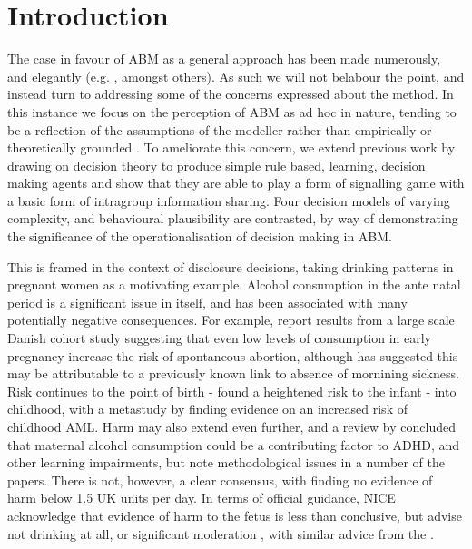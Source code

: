\section{Introduction}
\label{sec:intro}

The case in favour of \ac{ABM} as a general approach has been made numerously, and elegantly (e.g. \citet{Silverman2011,Silverman2013,Resnick,gilbert1999simulation,epstein1994growing,Macy2002a,Axelrod1997}, amongst others). As such we will not belabour the point, and instead turn to addressing some of the concerns expressed about the method. In this instance we focus on the perception of \ac{ABM} as ad hoc in nature, tending to be a reflection of the assumptions of the modeller rather than empirically or theoretically grounded \citep{Waldherr2013}. To ameliorate this concern, we extend previous work by \cite{GrayDissert} drawing on decision theory to produce simple rule based, learning, decision making agents and show that they are able to play a form of signalling game \citep{Kreps1987} with a basic form of intragroup information sharing. Four decision models of varying complexity, and behavioural plausibility are contrasted, by way of demonstrating the significance of the operationalisation of decision making in \ac{ABM}.

This is framed in the context of disclosure decisions, taking drinking patterns in pregnant women as a motivating example. Alcohol consumption in the ante natal period is a significant issue in itself, and has been associated with many potentially negative consequences. For example, \citet{Andersen2012} report results from a large scale Danish cohort study suggesting that even low levels of consumption in early pregnancy increase the risk of spontaneous abortion, although \citet{Savitz2012} has suggested this may be attributable to a previously known link to absence of mornining sickness. Risk continues to the point of birth - \citet{Kesmodel2002} found a heightened risk to the infant - into childhood, with a metastudy by \citet{Latino-Martel2010} finding evidence on an increased risk of childhood \ac{AML}. Harm may also extend even further, and a review by \citet{Huizink2006} concluded that maternal alcohol consumption could be a contributing factor to \ac{ADHD}, and other learning impairments, but note methodological issues in a number of the papers. There is not, however, a clear consensus, with \citet{Gray2006} finding no evidence of harm below 1.5 UK units per day. In terms of official guidance, \ac{NICE} acknowledge that evidence of harm to the fetus is less than conclusive, but advise not drinking at all, or significant moderation \citep{NICE2010a}, with similar advice from the \cite{DepartmentofHealth2008}.

